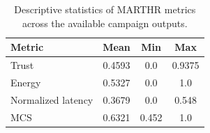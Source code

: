 \begin{table}[t]
\centering
\caption{Descriptive statistics of MARTHR metrics across the available campaign outputs.}
\label{tab:results}
\begin{tabular}{lccc}
\toprule
Metric & Mean & Min & Max \\ 
\midrule
Trust & 0.4593 & 0.0 & 0.9375 \\ 
Energy & 0.5327 & 0.0 & 1.0 \\ 
Normalized latency & 0.3679 & 0.0 & 0.548 \\ 
MCS & 0.6321 & 0.452 & 1.0 \\ 
\bottomrule
\end{tabular}
\end{table}
